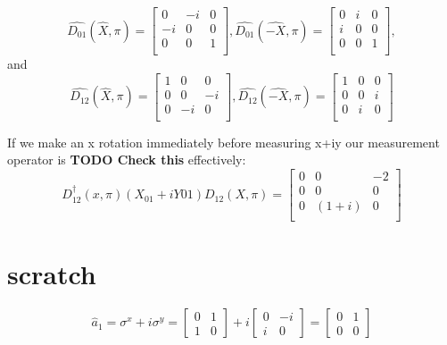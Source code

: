 \begin{equation}
    \hat{D_{01}}(\hat{X}, \pi)=
    \begin{bmatrix}
        0  & -i & 0 \\
        -i & 0 & 0 \\
        0  & 0 & 1 \\
    \end{bmatrix},
    \hat{D_{01}}(\hat{-X}, \pi)=
    \begin{bmatrix}
        0  & i & 0 \\
        i & 0 & 0 \\
        0  & 0 & 1 \\
    \end{bmatrix},
\end{equation}
and
\begin{equation}
    \hat{D_{12}}(\hat{X}, \pi)=
    \begin{bmatrix}
        1 & 0 & 0 \\
        0 & 0 & -i \\
        0 & -i & 0 \\
    \end{bmatrix},
    \hat{D_{12}}(\hat{-X}, \pi)=
    \begin{bmatrix}
        1 & 0 & 0 \\
        0 & 0 & i \\
        0 & i & 0 \\
    \end{bmatrix}
\end{equation}

If we make an x rotation immediately before measuring x+iy our measurement operator is \textbf{TODO Check this} effectively:
\begin{equation}
    D_{12}^{\dagger}(x,\pi)(X_{01}+iY{01})D_{12}(X,\pi) =
    \begin{bmatrix}
        0 & 0 & -2 \\
        0 & 0 & 0 \\
        0 & (1+i) & 0 \\
    \end{bmatrix}
\end{equation}

\section{scratch}

\begin{equation}
    \hat{a}_1 = \sigma^{x} + i \sigma^{y} =
    \begin{bmatrix}
        0 & 1 \\
        1 & 0
    \end{bmatrix}
    +
    i
    \begin{bmatrix}
        0 & -i \\
        i & 0
    \end{bmatrix}
    =
    \begin{bmatrix}
        0 & 1 \\
        0 & 0
    \end{bmatrix}
\end{equation}

